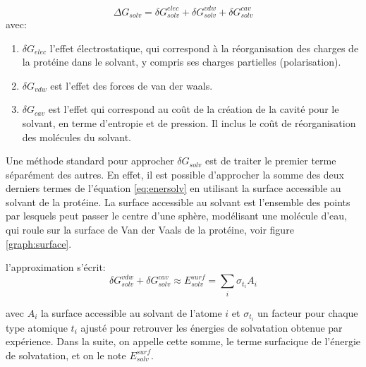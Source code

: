 \begin{equation}
  \label{eq:enersolv}
  \Delta G_{solv} = \delta G_{solv}^{elec} + \delta G_{solv}^{vdw} + \delta G_{solv}^{cav}
\end{equation}
avec:

\begin{enumerate}
\item $\delta G_{elec}$ l'effet électrostatique, qui correspond à la réorganisation des charges de la protéine dans le solvant, y compris ses charges partielles (polarisation).
\item $\delta G_{vdw}$ est l'effet des forces de van der waals.
  \item $\delta G_{cav}$ est l'effet qui correspond au coût de la création de la cavité pour le solvant, en terme d'entropie et de pression. Il inclus le coût de réorganisation des molécules du solvant.
\end{enumerate}

Une méthode standard pour approcher $\delta G_{solv}$ est de traiter le premier terme séparément des autres. En effet, il est possible d'approcher la somme des deux derniers termes de l'équation  \ref{eq:enersolv} en utilisant la surface accessible au solvant de la protéine. La surface accessible au solvant est l'ensemble des points par lesquels peut passer le centre d'une sphère, modélisant une molécule d'eau, qui roule sur la surface de Van der Vaals de la protéine, voir figure \ref{graph:surface}.

l'approximation s'écrit:
\begin{equation}
  \label{eq:SA}
\delta G_{solv}^{vdw} + \delta G_{solv}^{cav} \approx E_{solv}^{surf} = \sum_i \sigma_{t_i} A_i
\end{equation}

avec $A_i$ la surface accessible au solvant de l'atome $i$  et $\sigma_{t_i}$ un facteur pour chaque type atomique $t_i$ ajusté pour retrouver les énergies de solvatation obtenue par expérience.
Dans la suite, on appelle cette somme, le terme surfacique de l'énergie de solvatation, et on le note $E_{solv}^{surf}$.

